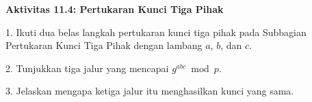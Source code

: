 \begin{obeactivity}
\textbf{Aktivitas 11.4: Pertukaran Kunci Tiga Pihak}

1. Ikuti dua belas langkah pertukaran kunci tiga pihak pada Subbagian
   Pertukaran Kunci Tiga Pihak dengan lambang $a$, $b$, dan $c$.

2. Tunjukkan tiga jalur yang mencapai $g^{abc} \bmod p$.

3. Jelaskan mengapa ketiga jalur itu menghasilkan kunci yang sama.
\end{obeactivity}
